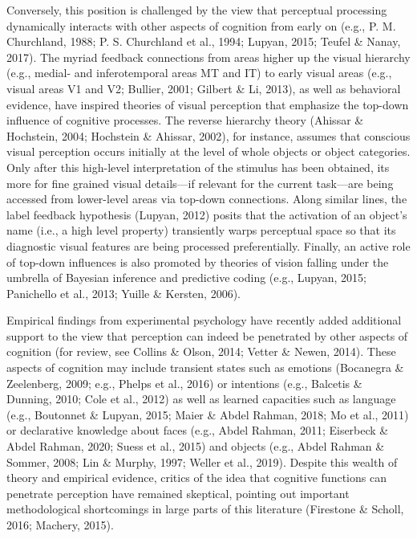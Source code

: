 \documentclass[
  english,
  man,12pt,twoside]{apa7}
\begin{document}
Conversely, this position is challenged by the view that perceptual processing dynamically interacts with other aspects of cognition from early on (e.g., P. M. Churchland, 1988; P. S. Churchland et al., 1994; Lupyan, 2015; Teufel \& Nanay, 2017). The myriad feedback connections from areas higher up the visual hierarchy (e.g., medial- and inferotemporal areas MT and IT) to early visual areas (e.g., visual areas V1 and V2; Bullier, 2001; Gilbert \& Li, 2013), as well as behavioral evidence, have inspired theories of visual perception that emphasize the top-down influence of cognitive processes. The reverse hierarchy theory (Ahissar \& Hochstein, 2004; Hochstein \& Ahissar, 2002), for instance, assumes that conscious visual perception occurs initially at the level of whole objects or object categories. Only after this high-level interpretation of the stimulus has been obtained, its more for fine grained visual details---if relevant for the current task---are being accessed from lower-level areas via top-down connections. Along similar lines, the label feedback hypothesis (Lupyan, 2012) posits that the activation of an object's name (i.e., a high level property) transiently warps perceptual space so that its diagnostic visual features are being processed preferentially. Finally, an active role of top-down influences is also promoted by theories of vision falling under the umbrella of Bayesian inference and predictive coding (e.g., Lupyan, 2015; Panichello et al., 2013; Yuille \& Kersten, 2006).

Empirical findings from experimental psychology have recently added additional support to the view that perception can indeed be penetrated by other aspects of cognition (for review, see Collins \& Olson, 2014; Vetter \& Newen, 2014). These aspects of cognition may include transient states such as emotions (Bocanegra \& Zeelenberg, 2009; e.g., Phelps et al., 2016) or intentions (e.g., Balcetis \& Dunning, 2010; Cole et al., 2012) as well as learned capacities such as language (e.g., Boutonnet \& Lupyan, 2015; Maier \& Abdel Rahman, 2018; Mo et al., 2011) or declarative knowledge about faces (e.g., Abdel Rahman, 2011; Eiserbeck \& Abdel Rahman, 2020; Suess et al., 2015) and objects (e.g., Abdel Rahman \& Sommer, 2008; Lin \& Murphy, 1997; Weller et al., 2019). Despite this wealth of theory and empirical evidence, critics of the idea that cognitive functions can penetrate perception have remained skeptical, pointing out important methodological shortcomings in large parts of this literature (Firestone \& Scholl, 2016; Machery, 2015).
\end{document}

